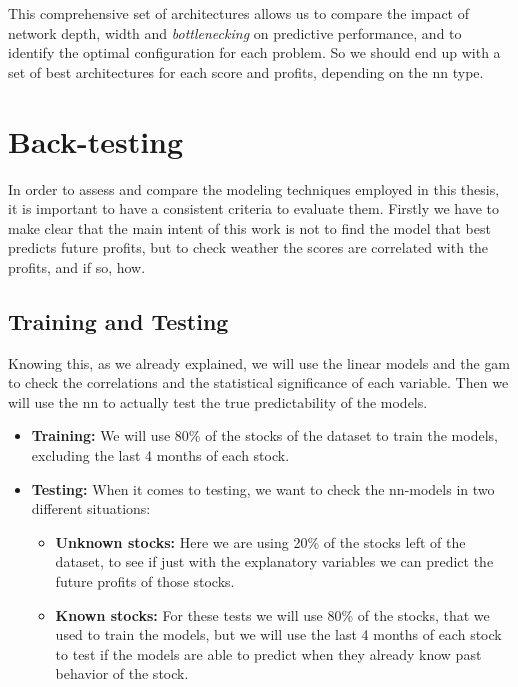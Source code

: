 \documentclass[11pt,english,a4paper,hidelinks]{book}
\begin{document}
\noindent
This comprehensive set of architectures allows us to compare the impact of network depth, width and \textit{bottlenecking} on predictive performance, and to identify the optimal configuration for each problem. So we should end up with a set of best architectures for each score and profits, depending on the \acrshort{nn} type.


\section{Back-testing}

In order to assess and compare the modeling techniques employed in this thesis, it is important to have a consistent criteria to evaluate them. Firstly we have to make clear that the main intent of this work is not to find the model that best predicts future profits, but to check weather the scores are correlated with the profits, and if so, how.

\subsection{Training and Testing}
\noindent
Knowing this, as we already explained, we will use the linear models and the \acrshort{gam} to check the correlations and the statistical significance of each variable. Then we will use the \acrshort{nn} to actually test the true predictability of the models. 

\begin{itemize}
    \item \textbf{Training:} We will use 80\% of the stocks of the dataset to train the models, excluding the last 4 months of each stock.
    \item \textbf{Testing:} When it comes to testing, we want to check the \acrshort{nn}-models in two different situations:
    \begin{itemize}
        \item \textbf{Unknown stocks:} Here we are using 20\% of the stocks left of the dataset, to see if just with the explanatory variables we can predict the future profits of those stocks.
        \item \textbf{Known stocks:} For these tests we will use 80\% of the stocks, that we used to train the models, but we will use the last 4 months of each stock to test if the models are able to predict when they already know past behavior of the stock.
    \end{itemize}
\end{itemize}
\end{document}
